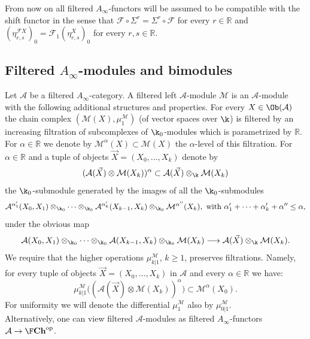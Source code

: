 From now on all filtered $A_{\infty}$-functors will be assumed to be
compatible with the shift functor in the sense that
$\mathcal{F} \circ \Sigma^r = \Sigma^r \circ \mathcal{F}$ for every
$r \in \mathbb{R}$ and
$(\eta^{\mathcal{F} X}_{r,s})_0 = \mathcal{F}_1(\eta^{X}_{r,s})_0$ for
every $r, s \in \mathbb{R}$.


\subsection{Filtered $A_{\infty}$-modules and
  bimodules} \label{a:fmod} Let $\mathcal{A}$ be a filtered
$A_{\infty}$-category. A filtered left $\mathcal{A}$-module
$\mathcal{M}$ is an $\mathcal{A}$-module with the following additional
structures and properties. For every $X \in \Ob(\mathcal{A})$ the
chain complex $(\mathcal{M}(X), \mu^{\mathcal{M}}_1)$ (of vector
spaces over $\k$) is filtered by an increasing filtration of
subcomplexes of $\k_0$-modules which is parametrized by
$\mathbb{R}$. For $\alpha \in \mathbb{R}$ we denote by
$\mathcal{M}^{\alpha}(X) \subset \mathcal{M}(X)$ the $\alpha$-level of
this filtration. For $\alpha \in \mathbb{R}$ and a tuple of objects
$\vec{X} = (X_0, \ldots, X_k)$ denote by
\begin{equation} \label{eq:fil-AM}
  (\mathcal{A}(\vec{X}) \otimes \mathcal{M}(X_k))^{\alpha} \subset
  \mathcal{A}(\vec{X}) \otimes_{\k} \mathcal{M}(X_k)
\end{equation}
the $\k_0$-submodule generated by the images of all the
$\k_0$-submodules
$$\mathcal{A}^{\alpha'_1}(X_0, X_1) \otimes_{\k_0} \cdots
\otimes_{\k_0}\mathcal{A}^{\alpha'_k}(X_{k-1}, X_k) \otimes_{\k_0}
\mathcal{M}^{\alpha''}(X_k), \text{ with } \alpha'_1 + \cdots+
\alpha'_k + \alpha'' \leq \alpha,$$ under the obvious map
$$\mathcal{A}(X_0, X_1) \otimes_{\k_0} \cdots
\otimes_{\k_0}\mathcal{A}(X_{k-1}, X_k) \otimes_{\k_0}
\mathcal{M}(X_k) \longrightarrow \mathcal{A}(\vec{X}) \otimes_{\k}
\mathcal{M}(X_k).$$ We require that the higher operations
$\mu^{\mathcal{M}}_{k|1}$, $k \geq 1$, preserves filtrations. Namely, for every tuple of objects
$\vec{X} = (X_0, \ldots, X_k)$ in $\mathcal{A}$ and every
$\alpha \in \mathbb{R}$ we have:
$$\mu^{\mathcal{M}}_{k|1} \bigl( (\mathcal{A}(\vec{X}) \otimes
\mathcal{M}(X_k))^{\alpha}) \subset \mathcal{M}^{\alpha}(X_0).$$ For
uniformity we will denote the differential $\mu_1^{\mathcal{M}}$ also
by $\mu_{0|1}^{\mathcal{M}}$.\\
Alternatively, one can view filtered $\mathcal{A}$-modules as filtered $A_\infty$-functors $\mathcal{A}\to \F\textbf{Ch}^{\text{op}}$.

